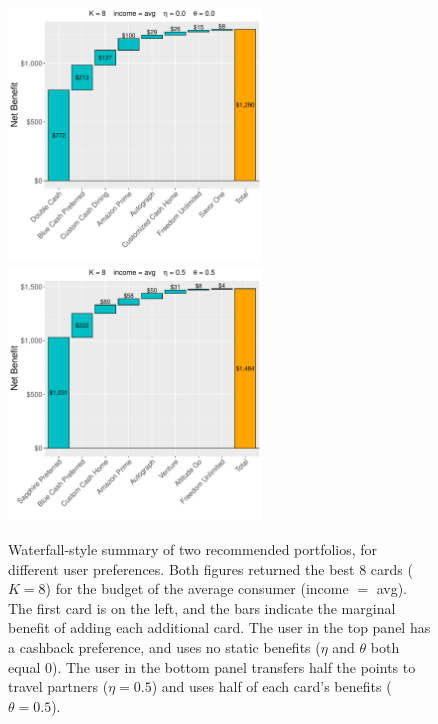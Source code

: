 \begin{figure}[tbh]
    \begin{center}
    \includegraphics[width=0.6\textwidth]{../Figures/Waterfall_avg_8_0_0.pdf}
    \includegraphics[width=0.6\textwidth]{../Figures/Waterfall_avg_8_05_05.pdf}
    \caption{Waterfall-style summary of two recommended portfolios, for different user preferences. Both figures returned the best 8 cards ($K=8$) for the budget of the average consumer (income $=$ avg). The first card is on the left, and the bars indicate the marginal benefit of adding each additional card. The user in the top panel has a cashback preference, and uses no static benefits ($\eta$ and $\theta$ both equal 0). The user in the bottom panel transfers half the points to travel partners ($\eta = 0.5$) and uses half of each card's benefits ($\theta = 0.5$).}
    \label{fig:Waterfall}
    \end{center}
\end{figure}

